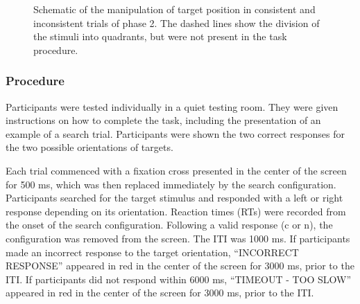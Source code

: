 \documentclass[
  man,
  floatsintext,
  longtable,
  nolmodern,
  notxfonts,
  notimes,
  colorlinks=true,linkcolor=blue,citecolor=blue,urlcolor=blue]{apa7}
\begin{document}
\begin{figure}[H]


\caption{\label{fig-schematic}Schematic of the manipulation of target
position in consistent and inconsistent trials of phase 2. The dashed
lines show the division of the stimuli into quadrants, but were not
present in the task procedure.}

\end{figure}%

\subsubsection{Procedure}\label{procedure}

Participants were tested individually in a quiet testing room. They were
given instructions on how to complete the task, including the
presentation of an example of a search trial. Participants were shown
the two correct responses for the two possible orientations of targets.

Each trial commenced with a fixation cross presented in the center of
the screen for 500 ms, which was then replaced immediately by the search
configuration. Participants searched for the target stimulus and
responded with a left or right response depending on its orientation.
Reaction times (RTs) were recorded from the onset of the search
configuration. Following a valid response (c or n), the configuration
was removed from the screen. The ITI was 1000 ms. If participants made
an incorrect response to the target orientation, ``INCORRECT RESPONSE''
appeared in red in the center of the screen for 3000 ms, prior to the
ITI. If participants did not respond within 6000 ms, ``TIMEOUT - TOO
SLOW'' appeared in red in the center of the screen for 3000 ms, prior to
the ITI.
\end{document}
